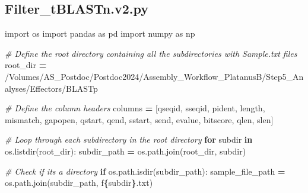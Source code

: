 \documentclass[
]{book}
\newenvironment{Shaded}{\begin{snugshade}}{\end{snugshade}}
\newcommand{\CommentTok}[1]{\textcolor[rgb]{0.56,0.35,0.01}{\textit{#1}}}
\newcommand{\ControlFlowTok}[1]{\textcolor[rgb]{0.13,0.29,0.53}{\textbf{#1}}}
\newcommand{\ImportTok}[1]{#1}
\newcommand{\KeywordTok}[1]{\textcolor[rgb]{0.13,0.29,0.53}{\textbf{#1}}}
\newcommand{\NormalTok}[1]{#1}
\newcommand{\OperatorTok}[1]{\textcolor[rgb]{0.81,0.36,0.00}{\textbf{#1}}}
\newcommand{\SpecialCharTok}[1]{\textcolor[rgb]{0.81,0.36,0.00}{\textbf{#1}}}
\newcommand{\SpecialStringTok}[1]{\textcolor[rgb]{0.31,0.60,0.02}{#1}}
\newcommand{\StringTok}[1]{\textcolor[rgb]{0.31,0.60,0.02}{#1}}
\begin{document}
\subsection{Filter\_tBLASTn.v2.py}\label{filtertblastn2-script}

\begin{Shaded}
\begin{Highlighting}[]
\ImportTok{import}\NormalTok{ os}
\ImportTok{import}\NormalTok{ pandas }\ImportTok{as}\NormalTok{ pd}
\ImportTok{import}\NormalTok{ numpy }\ImportTok{as}\NormalTok{ np}

\CommentTok{\# Define the root directory containing all the subdirectories with Sample.txt files}
\NormalTok{root\_dir }\OperatorTok{=} \StringTok{\textquotesingle{}/Volumes/AS\_Postdoc/Postdoc2024/Assembly\_Workflow\_PlatanusB/Step5\_Analyses/Effectors/BLASTp\textquotesingle{}}

\CommentTok{\# Define the column headers}
\NormalTok{columns }\OperatorTok{=}\NormalTok{ [}\StringTok{\textquotesingle{}qseqid\textquotesingle{}}\NormalTok{, }\StringTok{\textquotesingle{}sseqid\textquotesingle{}}\NormalTok{, }\StringTok{\textquotesingle{}pident\textquotesingle{}}\NormalTok{, }\StringTok{\textquotesingle{}length\textquotesingle{}}\NormalTok{, }\StringTok{\textquotesingle{}mismatch\textquotesingle{}}\NormalTok{, }\StringTok{\textquotesingle{}gapopen\textquotesingle{}}\NormalTok{, }
           \StringTok{\textquotesingle{}qstart\textquotesingle{}}\NormalTok{, }\StringTok{\textquotesingle{}qend\textquotesingle{}}\NormalTok{, }\StringTok{\textquotesingle{}sstart\textquotesingle{}}\NormalTok{, }\StringTok{\textquotesingle{}send\textquotesingle{}}\NormalTok{, }\StringTok{\textquotesingle{}evalue\textquotesingle{}}\NormalTok{, }\StringTok{\textquotesingle{}bitscore\textquotesingle{}}\NormalTok{, }\StringTok{\textquotesingle{}qlen\textquotesingle{}}\NormalTok{, }\StringTok{\textquotesingle{}slen\textquotesingle{}}\NormalTok{]}

\CommentTok{\# Loop through each subdirectory in the root directory}
\ControlFlowTok{for}\NormalTok{ subdir }\KeywordTok{in}\NormalTok{ os.listdir(root\_dir):}
\NormalTok{    subdir\_path }\OperatorTok{=}\NormalTok{ os.path.join(root\_dir, subdir)}
    
    \CommentTok{\# Check if it\textquotesingle{}s a directory}
    \ControlFlowTok{if}\NormalTok{ os.path.isdir(subdir\_path):}
\NormalTok{        sample\_file\_path }\OperatorTok{=}\NormalTok{ os.path.join(subdir\_path, }\SpecialStringTok{f\textquotesingle{}}\SpecialCharTok{\{}\NormalTok{subdir}\SpecialCharTok{\}}\SpecialStringTok{.txt\textquotesingle{}}\NormalTok{)}
        

\end{Highlighting}
\end{Shaded}
\end{document}
